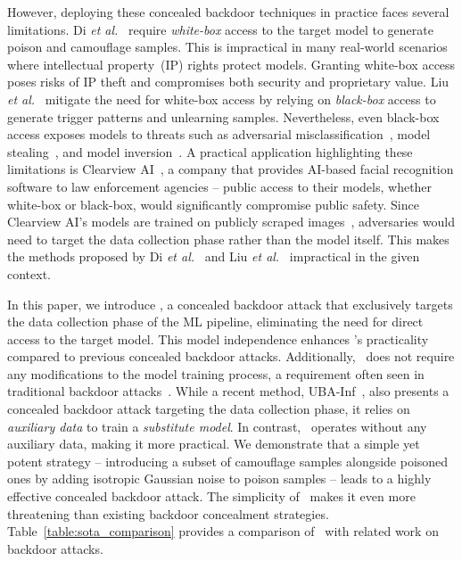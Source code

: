 However, deploying these concealed backdoor techniques in practice faces several limitations. Di \textit{et al.}~\cite{DBLP:conf/nips/DiDA0S23} require \textit{white-box} access to the target model to generate poison and camouflage samples. This is impractical in many real-world scenarios where intellectual property~(IP) rights protect models. Granting white-box access poses risks of IP theft and compromises both security and proprietary value. Liu \textit{et al.}~\cite{DBLP:conf/aaai/LiuWHM24} mitigate the need for white-box access by relying on \textit{black-box} access to generate trigger patterns and unlearning samples. Nevertheless, even black-box access exposes models to threats such as adversarial misclassification~\cite{adversarial_example_survey}, model stealing~\cite{model_stealing_survey}, and model inversion~\cite{model_inversion_sok}. A practical application highlighting these limitations is Clearview AI~\cite{clearview_usage}, a company that provides AI-based facial recognition software to law enforcement agencies -- public access to their models, whether white-box or black-box, would significantly compromise public safety. Since Clearview AI's models are trained on publicly scraped images~\cite{clearview_faq,clearview_data}, adversaries would need to target the data collection phase rather than the model itself. This makes the methods proposed by Di \textit{et al.}~\cite{DBLP:conf/nips/DiDA0S23} and Liu \textit{et al.}~\cite{DBLP:conf/aaai/LiuWHM24} impractical in the given context.

In this paper, we introduce \methodname, a concealed backdoor attack that exclusively targets the data collection phase of the ML pipeline, eliminating the need for direct access to the target model. This model independence enhances \methodname's practicality compared to previous concealed backdoor attacks. Additionally, \methodname~does not require any modifications to the model training process, a requirement often seen in traditional backdoor attacks~\cite{inputaware,blind,lira}. While a recent method, UBA-Inf~\cite{uba}, also presents a concealed backdoor attack targeting the data collection phase, it relies on \textit{auxiliary data} to train a \textit{substitute model}. In contrast, \methodname~operates without any auxiliary data, making it more practical. We demonstrate that a simple yet potent strategy -- introducing a subset of camouflage samples alongside poisoned ones by adding isotropic Gaussian noise to poison samples -- leads to a highly effective concealed backdoor attack. The simplicity of \methodname~makes it even more threatening than existing backdoor concealment strategies. Table~\ref{table:sota_comparison} provides a comparison of \methodname~with related work on backdoor attacks.


